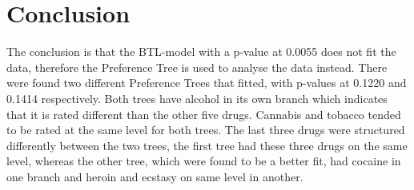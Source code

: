 \section*{Conclusion}
\label{Conclusion}
%
The conclusion is that the BTL-model with a p-value at 0.0055 does not fit the data, therefore the Preference Tree is used to analyse the data instead. There were found two different Preference Trees that fitted, with p-values at 0.1220 and 0.1414 respectively. Both trees have alcohol in its own branch which indicates that it is rated different than the other five drugs. Cannabis and tobacco tended to be rated at the same level for both trees. The last three drugs were structured differently between the two trees, the first tree had these three drugs on the same level, whereas the other tree, which were found to be a better fit, had cocaine in one branch and heroin and ecstasy on same level in another. 